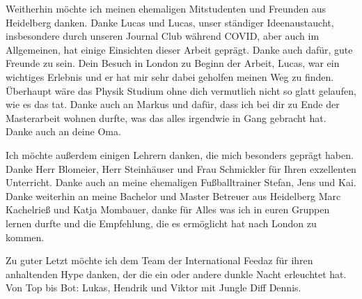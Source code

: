 Weitherhin möchte ich meinen ehemaligen Mitstudenten und Freunden aus Heidelberg danken. Danke Lucas und Lucas, unser ständiger Ideenaustaucht, insbesondere durch unseren Journal Club während COVID, aber auch im Allgemeinen, hat einige Einsichten dieser Arbeit geprägt. Danke auch dafür, gute Freunde zu sein. Dein Besuch in London zu Beginn der Arbeit, Lucas, war ein wichtiges Erlebnis und er hat mir sehr dabei geholfen meinen Weg zu finden. Überhaupt wäre das Physik Studium ohne dich vermutlich nicht so glatt gelaufen, wie es das tat. Danke auch an Markus und dafür, dass ich bei dir zu Ende der Masterarbeit wohnen durfte, was das alles irgendwie in Gang gebracht hat. Danke auch an deine Oma.

Ich möchte außerdem einigen Lehrern danken, die mich besonders geprägt haben. Danke Herr Blomeier, Herr Steinhäuser  und Frau Schmickler für Ihren exzellenten Unterricht. Danke auch an meine ehemaligen Fußballtrainer Stefan, Jens und Kai. Danke weiterhin an meine Bachelor und Master Betreuer aus Heidelberg Marc Kachelrieß und Katja Mombauer, danke für Alles was ich in euren Gruppen lernen durfte und die Empfehlung, die es ermöglicht hat nach London zu kommen.

Zu guter Letzt möchte ich dem Team der International Feedaz für ihren anhaltenden Hype danken, der die ein oder andere dunkle Nacht erleuchtet hat. Von Top bis Bot: Lukas, Hendrik und Viktor mit Jungle Diff Dennis.
